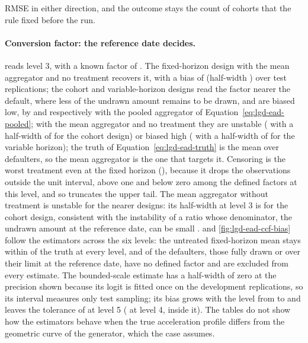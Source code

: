 RMSE in either direction, and the outcome stays the count of cohorts that the rule fixed before the run.





\paragraph{Conversion factor: the reference date decides.}  reads level 3, with a known factor of . The fixed-horizon design with the mean aggregator and no treatment recovers it, with a bias of  (half-width ) over  test replications; the cohort and variable-horizon designs read the factor nearer the default, where less of the undrawn amount remains to be drawn, and are biased low, by  and  respectively with the pooled aggregator of Equation~\eqref{eq:lgd-ead-pooled}; with the mean aggregator and no treatment they are unstable ( with a half-width of  for the cohort design) or biased high ( with a half-width of  for the variable horizon); the truth of Equation~\eqref{eq:lgd-ead-truth} is the mean over defaulters, so the mean aggregator is the one that targets it. Censoring is the worst treatment even at the fixed horizon (), because it drops the observations outside the unit interval,  above one and  below zero among the  defined factors at this level, and so truncates the upper tail. The mean aggregator without treatment is unstable for the nearer designs: its half-width at level 3 is  for the cohort design, consistent with the instability of a ratio whose denominator, the undrawn amount at the reference date, can be small \citep{lgd-ead:qi2009}.  and \cref{fig:lgd-ead-ccf-bias} follow the estimators across the six levels: the untreated fixed-horizon mean stays within  of the truth at every level, and  of the defaulters, those fully drawn or over their limit at the reference date, have no defined factor and are excluded from every estimate. The bounded-scale estimate has a half-width of zero at the precision shown because its logit is fitted once on the development replications, so its interval measures only test sampling; its bias grows with the level from  to  and leaves the tolerance of  at level 5 ( at level 4, inside it). The tables do not show how the estimators behave when the true acceleration profile differs from the geometric curve of the generator, which the case assumes.

